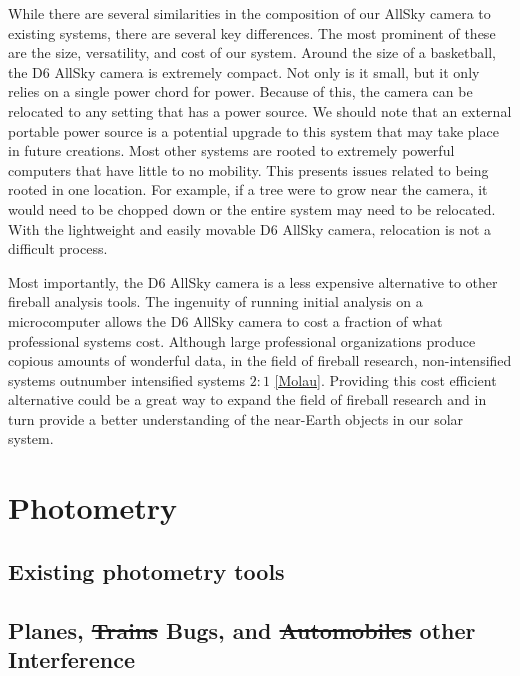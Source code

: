 While there are several similarities in the composition of our AllSky camera to existing systems, there are several key differences.
The most prominent of these are the size, versatility, and cost of our system.
Around the size of a basketball, the D6 AllSky camera is extremely compact.  
Not only is it small, but it only relies on a single power chord for power.  
Because of this, the camera can be relocated to any setting that has a power source.  
We should note that an external portable power source is a potential upgrade to this system that may take place in future creations.
Most other systems are rooted to extremely powerful computers that have little to no mobility.
This presents issues related to being rooted in one location.
For example, if a tree were to grow near the camera, it would need to be chopped down or the entire system may need to be relocated.
With the lightweight and easily movable D6 AllSky camera, relocation is not a difficult process.

Most importantly, the D6 AllSky camera is a less expensive alternative to other fireball analysis tools.  
The ingenuity of running initial analysis on a microcomputer allows the D6 AllSky camera to cost a fraction of what professional systems cost.
Although large professional organizations produce copious amounts of wonderful data, in the field of fireball research, non-intensified systems outnumber intensified systems $2:1$ \ref{Molau}.  
Providing this cost efficient alternative could be a great way to expand the field of fireball research and in turn provide a better understanding of the near-Earth objects in our solar system.






\section{Photometry}

\subsection{Existing photometry tools}



\subsection{Planes, \st{Trains} Bugs, and \st{Automobiles} other Interference}







